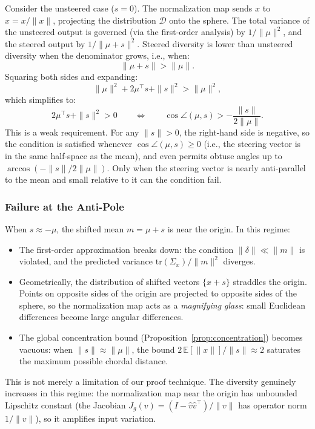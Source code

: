Consider the unsteered case ($s = 0$).
The normalization map sends $x$ to $\hat{x} = x / \|x\|$, projecting
the distribution $\mathcal{D}$ onto the sphere.
The total variance of the unsteered output is governed (via the
first-order analysis) by $1/\|\mu\|^2$, and the steered output by
$1/\|\mu + s\|^2$.
Steered diversity is lower than unsteered diversity when the denominator
grows, i.e., when:
%
\begin{equation}
  \|\mu + s\| > \|\mu\|.
  \label{eq:diversity-condition}
\end{equation}
%
Squaring both sides and expanding:
%
\begin{equation}
  \|\mu\|^2 + 2\mu^\top s + \|s\|^2 > \|\mu\|^2,
\end{equation}
%
which simplifies to:
%
\begin{equation}
  2\mu^\top s + \|s\|^2 > 0
  \qquad\Longleftrightarrow\qquad
  \cos\angle(\mu, s) > -\frac{\|s\|}{2\|\mu\|}.
  \label{eq:angle-condition}
\end{equation}
%
This is a weak requirement.
For any $\|s\| > 0$, the right-hand side is negative, so the condition
is satisfied whenever $\cos\angle(\mu, s) \geq 0$
(i.e., the steering vector is in the same half-space as the mean),
and even permits obtuse angles up to
$\arccos(-\|s\| / 2\|\mu\|)$.
Only when the steering vector is nearly anti-parallel to the mean and
small relative to it can the condition fail.

\subsubsection{Failure at the Anti-Pole}
\label{sec:anti-pole}

When $s \approx -\mu$, the shifted mean $m = \mu + s$ is near the origin.
In this regime:
%
\begin{itemize}
  \item The first-order approximation breaks down:
    the condition $\|\delta\| \ll \|m\|$ is violated, and the predicted
    variance $\mathrm{tr}(\Sigma_x) / \|m\|^2$ diverges.
  \item Geometrically, the distribution of shifted vectors $\{x + s\}$
    straddles the origin.
    Points on opposite sides of the origin are projected to opposite sides
    of the sphere, so the normalization map acts as a
    \emph{magnifying glass}: small Euclidean differences become large
    angular differences.
  \item The global concentration bound
    (Proposition~\ref{prop:concentration}) becomes vacuous: when
    $\|s\| \approx \|\mu\|$, the bound
    $2\,\mathbb{E}[\|x\|] / \|s\| \approx 2$ saturates the maximum
    possible chordal distance.
\end{itemize}
%
This is not merely a limitation of our proof technique.
The diversity genuinely increases in this regime: the normalization map
near the origin has unbounded Lipschitz constant
(the Jacobian $J_g(v) = (I - \hat{v}\hat{v}^\top)/\|v\|$ has operator
norm $1/\|v\|$), so it amplifies input variation.

